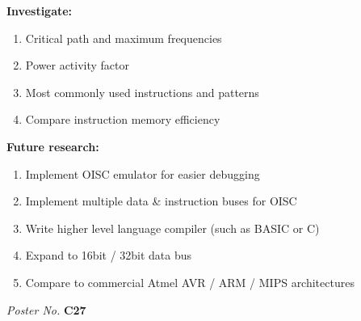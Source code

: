 \documentclass[portrait,color=UCLmidgreen,margin=1.5cm,bannerheight=8cm,logoheight=3.5cm]{uclposter}
\begin{document}
\begin{Row}
\begin{Cell}{2}
\begin{tcolorbox}[title=Future work]
\begin{multicols}{2}
		\textbf{Investigate:}
		\begin{enumerate}
			\item Critical path and maximum frequencies
			\item Power activity factor
			\item Most commonly used instructions and patterns 
			\item Compare instruction memory efficiency
			\\[-7pt] 
		\end{enumerate}
		\columnbreak
		\textbf{Future research:}
		\begin{enumerate}
			\item Implement OISC emulator for easier debugging
			\item Implement multiple data \& instruction buses for OISC
			\item Write higher level language compiler (such as BASIC or C)
			\item Expand to 16bit / 32bit data bus
			\item Compare to commercial Atmel AVR / ARM / MIPS  architectures		
		\end{enumerate}
		\hspace*{\fill}\textit{Poster No.} \large\textbf{C27}
	\end{multicols}

\end{tcolorbox}
\end{Cell}\end{Row}
\end{document}
